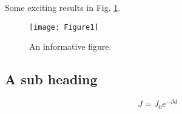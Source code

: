 Some exciting results in Fig. \ref{fig:usefulplot}.


\begin{figure}
    \centering
    \texttt{[image: Figure1]}
    \caption{An informative figure.}
    \label{fig:usefulplot}
\end{figure}

\subsection{A sub heading}


\begin{equation}
    \label{eq:beta}
    J = J_0 e^{-\beta d}
\end{equation}
